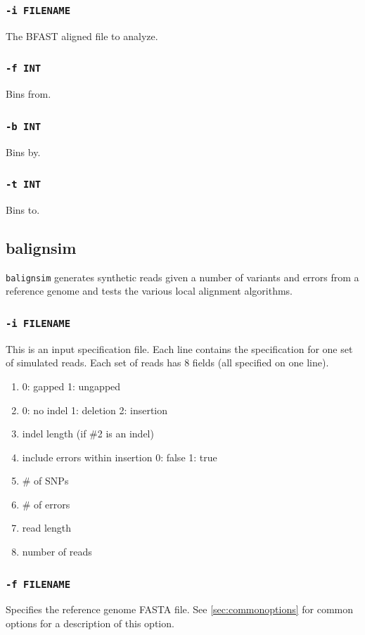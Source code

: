 \documentclass[a4paper,12pt]{book}
\newcommand{\TT}[1]{{\tt #1}} %
\newcommand{\rGFF}{reference genome FASTA file}
\newcommand{\BAF}{BFAST aligned file} %
\begin{document}
\subsubsection{\TT{-i FILENAME}}
The \BAF{} to analyze.
\subsubsection{\TT{-f INT}}
Bins from.
\subsubsection{\TT{-b INT}}
Bins by.
\subsubsection{\TT{-t INT}}
Bins to.
\subsection{balignsim}
\label{sec:balignsim}
\TT{balignsim} generates synthetic reads given a number of variants and errors from a reference genome and tests the various local alignment algorithms.

\subsubsection{\TT{-i FILENAME}}
This is an input specification file.
Each line contains the specification for one set of simulated reads.
Each set of reads has 8 fields (all specified on one line).
\begin{enumerate}
	\item 0: gapped 1: ungapped
	\item 0: no indel 1: deletion 2: insertion
	\item indel length (if \#2 is an indel)
	\item include errors within insertion 0: false 1: true
	\item \# of SNPs
	\item \# of errors
	\item read length
	\item number of reads
\end{enumerate}

\subsubsection{\TT{-f FILENAME}}
Specifies the \rGFF{}.
See \autoref{sec:commonoptions} for common options for a description of this option.
\end{document}

